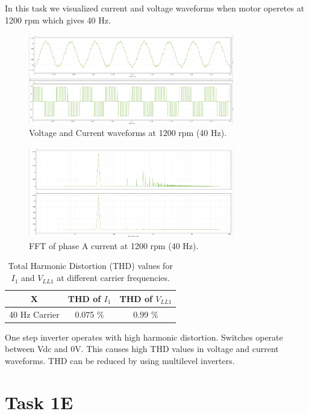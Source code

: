 \documentclass[12pt,a4paper]{report}
\begin{document}
In this task we visualized current and voltage waveforms when motor operetes at 1200 rpm which gives 40 Hz.
\begin{figure}[H]
    \centering
    \includegraphics[width=0.8\textwidth]{I1VLL1.png}
    \caption{Voltage and Current waveforms at 1200 rpm (40 Hz).}
    \label{fig:voltage-current-1200rpm}
\end{figure}
\begin{figure}[H]
    \centering
    \includegraphics[width=0.8\textwidth]{FFTspectrum1D.png}
    \caption{FFT of phase A current at 1200 rpm (40 Hz).}
    \label{fig:fft-current-1200rpm}
\end{figure}
\begin{table}[H]
    \centering
    \begin{tabular}{|c|c|c|}
        \hline
        	X & \textbf{THD of $I_1$} & \textbf{THD of $V_{LL1}$} \\
        \hline
        40 Hz Carrier & 0.075 \% & 0.99 \% \\
        
        \hline
    \end{tabular}
    \caption{Total Harmonic Distortion (THD) values for $I_1$ and $V_{LL1}$ at different carrier frequencies.}
    \label{tab:thd-values}
\end{table}

One step inverter operates with high harmonic distortion. Switches operate between Vdc and 0V.
This causes high THD values in voltage and current waveforms. THD can be reduced by using multilevel inverters.

\section{Task 1E}
\label{sec:task-1e}
\end{document}

